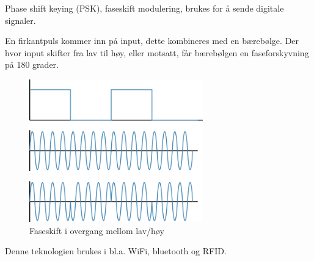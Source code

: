 Phase shift keying (PSK), faseskift modulering, brukes for å sende
digitale signaler.

En firkantpuls kommer inn på input, dette kombineres med en bærebølge.
Der hvor input skifter fra lav til høy, eller motsatt, får bærebølgen en
faseforskyvning på 180 grader.

\begin{figure}[H]
  \centering
  \includegraphics[width=0.67\textwidth]{./img/psk}
  \caption{Faseskift i overgang mellom lav/høy}
\end{figure}

Denne teknologien brukes i bl.a. WiFi, bluetooth og RFID.
